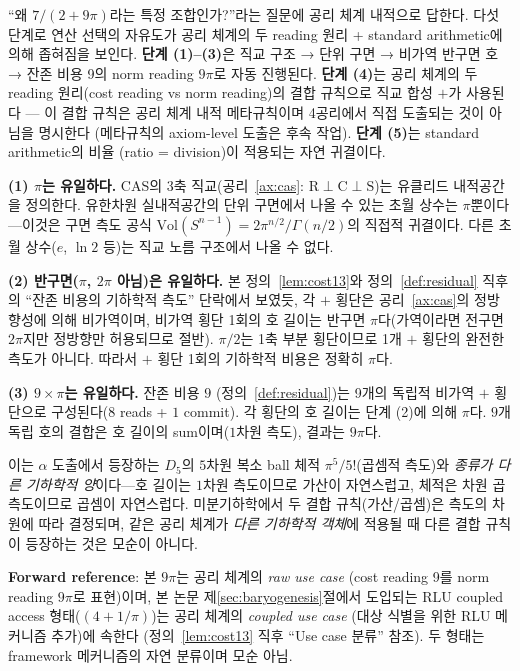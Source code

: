 \documentclass[entropy,article,submit,pdftex,oneauthor]{Definitions/mdpi}
\begin{document}
``왜 $7/(2+9\pi)$라는 특정 조합인가?''라는 질문에 공리 체계 내적으로 답한다. 다섯 단계로 연산 선택의 자유도가 공리 체계의 두 reading 원리 + standard arithmetic에 의해 좁혀짐을 보인다. \textbf{단계 (1)--(3)}은 직교 구조 → 단위 구면 → 비가역 반구면 호 → 잔존 비용 9의 norm reading $9\pi$로 자동 진행된다. \textbf{단계 (4)}는 공리 체계의 두 reading 원리(cost reading vs norm reading)의 결합 규칙으로 직교 합성 $+$가 사용된다 — 이 결합 규칙은 공리 체계 내적 메타규칙이며 4공리에서 직접 도출되는 것이 아님을 명시한다 (메타규칙의 axiom-level 도출은 후속 작업). \textbf{단계 (5)}는 standard arithmetic의 비율 (ratio = division)이 적용되는 자연 귀결이다.

\textbf{(1) $\pi$는 유일하다.} CAS의 3축 직교(공리~\ref{ax:cas}: $\mathrm{R} \perp \mathrm{C} \perp \mathrm{S}$)는 유클리드 내적공간을 정의한다. 유한차원 실내적공간의 단위 구면에서 나올 수 있는 초월 상수는 $\pi$뿐이다---이것은 구면 측도 공식 $\mathrm{Vol}(S^{n-1}) = 2\pi^{n/2}/\Gamma(n/2)$의 직접적 귀결이다. 다른 초월 상수($e$, $\ln 2$ 등)는 직교 노름 구조에서 나올 수 없다.

\textbf{(2) 반구면($\pi$, $2\pi$ 아님)은 유일하다.} 본 정의~\ref{lem:cost13}와 정의~\ref{def:residual} 직후의 ``잔존 비용의 기하학적 측도'' 단락에서 보였듯, 각 $+$ 횡단은 공리~\ref{ax:cas}의 정방향성에 의해 비가역이며, 비가역 횡단 1회의 호 길이는 반구면 $\pi$다(가역이라면 전구면 $2\pi$지만 정방향만 허용되므로 절반). $\pi/2$는 1축 부분 횡단이므로 1개 $+$ 횡단의 완전한 측도가 아니다. 따라서 $+$ 횡단 1회의 기하학적 비용은 정확히 $\pi$다.

\textbf{(3) $9 \times \pi$는 유일하다.} 잔존 비용 $9$ (정의~\ref{def:residual})는 9개의 독립적 비가역 $+$ 횡단으로 구성된다($8$ reads + $1$ commit). 각 횡단의 호 길이는 단계 (2)에 의해 $\pi$다. $9$개 독립 호의 결합은 호 길이의 sum이며($1$차원 측도), 결과는 $9\pi$다.

이는 $\alpha$ 도출에서 등장하는 $D_5$의 $5$차원 복소 ball 체적 $\pi^5/5!$(곱셈적 측도)와 \emph{종류가 다른 기하학적 양}이다---호 길이는 $1$차원 측도이므로 가산이 자연스럽고, 체적은 차원 곱 측도이므로 곱셈이 자연스럽다. 미분기하학에서 두 결합 규칙(가산/곱셈)은 측도의 차원에 따라 결정되며, 같은 공리 체계가 \emph{다른 기하학적 객체}에 적용될 때 다른 결합 규칙이 등장하는 것은 모순이 아니다.

\textbf{Forward reference}: 본 $9\pi$는 공리 체계의 \emph{raw use case} (cost reading 9를 norm reading $9\pi$로 표현)이며, 본 논문 제\ref{sec:baryogenesis}절에서 도입되는 RLU coupled access 형태($(4 + 1/\pi)$)는 공리 체계의 \emph{coupled use case} (대상 식별을 위한 RLU 메커니즘 추가)에 속한다 (정의~\ref{lem:cost13} 직후 ``Use case 분류'' 참조). 두 형태는 framework 메커니즘의 자연 분류이며 모순 아님.
\end{document}
